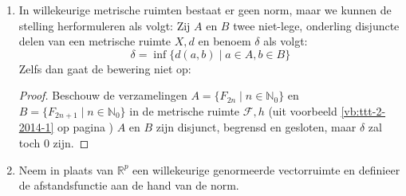 \documentclass[main.tex]{subfiles}
\begin{document}
\begin{st}
\begin{enumerate}
\begin{itemize}
\begin{proof}
        \noindent
        \begin{minipage}{.45\textwidth}
          \begin{figure}[H]
            \centering
          \end{figure}
        \end{minipage}
        \begin{minipage}{.45\textwidth}
          \[ A = \left\{ (x,+y) \mid x \in \interval[open]{0}{1} \wedge y\in \interval[open]{0}{1} \right\} \]
          \[ A = \left\{ (x,-y) \mid x \in \interval[open]{0}{1} \wedge y\in \interval[open]{0}{1} \right\} \]
        \end{minipage}
        
        Het is duidelijk dat $A$ en $B$ beide niet gesloten zijn, maar wel begrensd.
        $\delta$ is toch $0$:
        \[ \delta = \inf \{ \|a-b\| \mid a \in A, b \in B \} = \inf \interval[open]{0}{\sqrt{5}} \]
      \end{proof}
    \end{itemize}
  \item In willekeurige metrische ruimten bestaat er geen norm, maar we kunnen de stelling herformuleren als volgt:
    Zij $A$ en $B$ twee niet-lege, onderling disjuncte delen van een metrische ruimte $X,d$ en benoem $\delta$ als volgt:
    \[ \delta = \inf \{ d(a,b) \mid a\in A, b\in B \} \]
    Zelfs dan gaat de bewering niet op:
    \begin{proof}
      Beschouw de verzamelingen $A = \{ F_{2n} \mid n \in \mathbb{N}_{0} \}$ en $B = \{ F_{2n+1} \mid n\in \mathbb{N}_{0} \}$ in de metrische ruimte $\mathcal{F},h$ (uit voorbeeld \ref{vb:ttt-2-2014-1} op pagina \pageref{vb:ttt-2-2014-1}) 
      $A$ en $B$ zijn disjunct, begrensd en gesloten, maar $\delta$ zal toch $0$ zijn.
    \end{proof}
  \item Neem in plaats van $\mathbb{R}^{p}$ een willekeurige genormeerde vectorruimte en definieer de afstandsfunctie aan de hand van de norm.
  \end{enumerate}
  \feed
\end{st}
\end{document}
